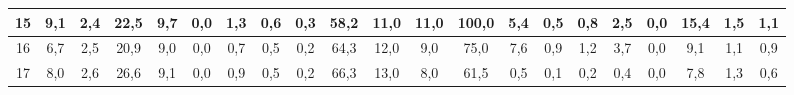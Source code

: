 \begin{sidewaystable}[]
\begin{tabular}{|c|c|c|c|c|c|c|c|c|c|c|c|c|c|c|c|c|c|c|c|c|}
    15 & 9,1                                              & 2,4                                              & 22,5                                             & 9,7                                              & 0,0                                              & 1,3                                              & 0,6                                              & 0,3                                              & 58,2                                            & 11,0                                            & 11,0                                            & 100,0                                           & 5,4                                             & 0,5                                             & 0,8                                             & 2,5                                             & 0,0                                             & 15,4                                             & 1,5                                              &  1,1                                               \\ \hline
    16 & 6,7                                              & 2,5                                              & 20,9                                             & 9,0                                              & 0,0                                              & 0,7                                              & 0,5                                              & 0,2                                              & 64,3                                            & 12,0                                            & 9,0                                             & 75,0                                            & 7,6                                             & 0,9                                             & 1,2                                             & 3,7                                             & 0,0                                             & 9,1                                              & 1,1                                              &  0,9                                               \\ \hline
    17 & 8,0                                              & 2,6                                              & 26,6                                             & 9,1                                              & 0,0                                              & 0,9                                              & 0,5                                              & 0,2                                              & 66,3                                            & 13,0                                            & 8,0                                             & 61,5                                            & 0,5                                             & 0,1                                             & 0,2                                             & 0,4                                             & 0,0                                             & 7,8                                              & 1,3                                              &  0,6                                               \\ \hline

\end{tabular}
\end{sidewaystable}
